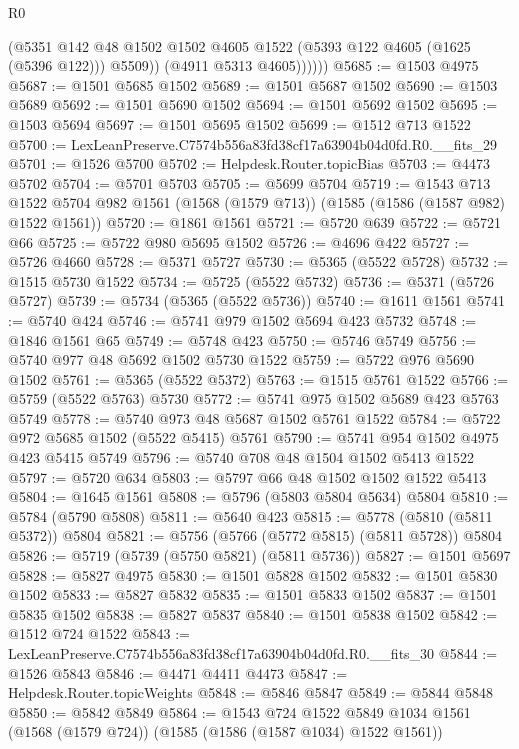 \begin{lexlean}{R0}
\begin{coremodule}
                (@5351
                  @142
                  @48
                  @1502
                  @1502
                  @4605
                  @1522
                  (@5393 @122 @4605 (@1625 (@5396 @122)))
                  @5509))
              (@4911 @5313 @4605))))))
@5685 := @1503 @4975
@5687 := @1501 @5685 @1502
@5689 := @1501 @5687 @1502
@5690 := @1503 @5689
@5692 := @1501 @5690 @1502
@5694 := @1501 @5692 @1502
@5695 := @1503 @5694
@5697 := @1501 @5695 @1502
@5699 := @1512 @713 @1522
@5700 := LexLeanPreserve.C7574b556a83fd38cf17a63904b04d0fd.R0.__fits_29
@5701 := @1526 @5700
@5702 := Helpdesk.Router.topicBias
@5703 := @4473 @5702
@5704 := @5701 @5703
@5705 := @5699 @5704
@5719 := @1543
    @713
    @1522
    @5704
    @982
    @1561
    (@1568 (@1579 @713))
    (@1585 (@1586 (@1587 @982) @1522 @1561))
@5720 := @1861 @1561
@5721 := @5720 @639
@5722 := @5721 @66
@5725 := @5722 @980 @5695 @1502
@5726 := @4696 @422
@5727 := @5726 @4660
@5728 := @5371 @5727
@5730 := @5365 (@5522 @5728)
@5732 := @1515 @5730 @1522
@5734 := @5725 (@5522 @5732)
@5736 := @5371 (@5726 @5727)
@5739 := @5734 (@5365 (@5522 @5736))
@5740 := @1611 @1561
@5741 := @5740 @424
@5746 := @5741 @979 @1502 @5694 @423 @5732
@5748 := @1846 @1561 @65
@5749 := @5748 @423
@5750 := @5746 @5749
@5756 := @5740 @977 @48 @5692 @1502 @5730 @1522
@5759 := @5722 @976 @5690 @1502
@5761 := @5365 (@5522 @5372)
@5763 := @1515 @5761 @1522
@5766 := @5759 (@5522 @5763) @5730
@5772 := @5741 @975 @1502 @5689 @423 @5763 @5749
@5778 := @5740 @973 @48 @5687 @1502 @5761 @1522
@5784 := @5722 @972 @5685 @1502 (@5522 @5415) @5761
@5790 := @5741 @954 @1502 @4975 @423 @5415 @5749
@5796 := @5740 @708 @48 @1504 @1502 @5413 @1522
@5797 := @5720 @634
@5803 := @5797 @66 @48 @1502 @1502 @1522 @5413
@5804 := @1645 @1561
@5808 := @5796 (@5803 @5804 @5634) @5804
@5810 := @5784 (@5790 @5808)
@5811 := @5640 @423
@5815 := @5778 (@5810 (@5811 @5372)) @5804
@5821 := @5756 (@5766 (@5772 @5815) (@5811 @5728)) @5804
@5826 := @5719 (@5739 (@5750 @5821) (@5811 @5736))
@5827 := @1501 @5697
@5828 := @5827 @4975
@5830 := @1501 @5828 @1502
@5832 := @1501 @5830 @1502
@5833 := @5827 @5832
@5835 := @1501 @5833 @1502
@5837 := @1501 @5835 @1502
@5838 := @5827 @5837
@5840 := @1501 @5838 @1502
@5842 := @1512 @724 @1522
@5843 := LexLeanPreserve.C7574b556a83fd38cf17a63904b04d0fd.R0.__fits_30
@5844 := @1526 @5843
@5846 := @4471 @4411 @4473
@5847 := Helpdesk.Router.topicWeights
@5848 := @5846 @5847
@5849 := @5844 @5848
@5850 := @5842 @5849
@5864 := @1543
    @724
    @1522
    @5849
    @1034
    @1561
    (@1568 (@1579 @724))
    (@1585 (@1586 (@1587 @1034) @1522 @1561))

\end{coremodule}
\end{lexlean}
